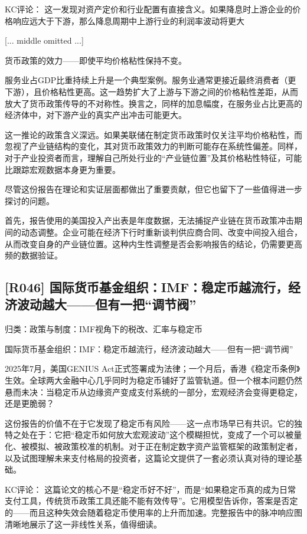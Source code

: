 \documentclass[11pt]{ctexart}
\begin{document}
KC评论： 这一发现对资产定价和行业配置有直接含义。如果降息时上游企业的价格响应远大于下游，那么降息周期中上游行业的利润率波动将更大

[... middle omitted ...]

货币政策的效力——即使平均价格粘性保持不变。

服务业占GDP比重持续上升是一个典型案例。服务业通常更接近最终消费者（更下游），且价格粘性更高。这一趋势扩大了上游与下游之间的价格粘性差距，从而放大了货币政策传导的不对称性。换言之，同样的加息幅度，在服务业占比更高的经济体中，对下游产业的真实产出冲击可能更大。

这一推论的政策含义深远。如果美联储在制定货币政策时仅关注平均价格粘性，而忽视了产业链结构的变化，其对货币政策效力的判断可能存在系统性偏差。同样，对于产业投资者而言，理解自己所处行业的“产业链位置”及其价格粘性特征，可能比跟踪宏观数据本身更为重要。

尽管这份报告在理论和实证层面都做出了重要贡献，但它也留下了一些值得进一步探讨的问题。

首先，报告使用的美国投入产出表是年度数据，无法捕捉产业链在货币政策冲击期间的动态调整。企业可能在经济下行时重新谈判供应商合同、改变中间投入组合，从而改变自身的产业链位置。这种内生性调整是否会影响报告的结论，仍需要更高频的数据验证。

\subsection{[R046] 国际货币基金组织：IMF：稳定币越流行，经济波动越大——但有一把“调节阀”}
{\small\color{refgray}归类：政策与制度：IMF视角下的税改、汇率与稳定币}

国际货币基金组织：IMF：稳定币越流行，经济波动越大——但有一把“调节阀”

2025年7月，美国GENIUS Act正式签署成为法律；一个月后，香港《稳定币条例》生效。全球两大金融中心几乎同时为稳定币铺好了监管轨道。但一个根本问题仍然悬而未决：当稳定币从边缘资产变成支付系统的一部分，宏观经济会变得更稳定，还是更脆弱？

这份报告的价值不在于它发现了稳定币有风险——这一点市场早已有共识。它的独特之处在于：它把“稳定币如何放大宏观波动”这个模糊担忧，变成了一个可以被量化、被模拟、被政策校准的机制。对于正在制定数字资产监管框架的政策制定者，以及试图理解未来支付格局的投资者，这篇论文提供了一套必须认真对待的理论基础。

KC评论： 这篇论文的核心不是“稳定币好不好”，而是“如果稳定币真的成为日常支付工具，传统货币政策工具还能不能有效传导”。它用模型告诉你，答案是否定的——而且这种失效会随着稳定币使用率的上升而加速。完整报告中的脉冲响应图清晰地展示了这一非线性关系，值得细读。
\end{document}
